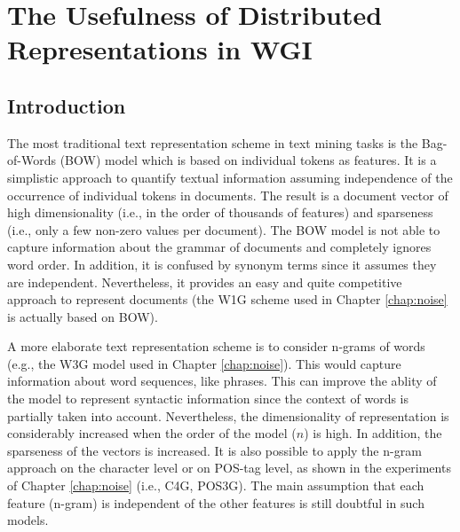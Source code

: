 
\chapter{The Usefulness of Distributed Representations in WGI}

\label{chap:word_embeddings}



\newcommand{\keyword}[1]{\textbf{#1}}
\newcommand{\tabhead}[1]{\textbf{#1}}
\newcommand{\code}[1]{\texttt{#1}}
\newcommand{\file}[1]{\texttt{\bfseries#1}}
\newcommand{\option}[1]{\texttt{\itshape#1}}


\section{Introduction}\label{chap:word_embeddings:sec:intro}
 
The most traditional text representation scheme in text mining tasks is the Bag-of-Words (BOW) model which is based on individual tokens as features. It is a simplistic approach to quantify textual information assuming independence of the occurrence of individual tokens in documents. The result is a document vector of high dimensionality (i.e., in the order of thousands of features) and sparseness (i.e., only a few non-zero values per document). The BOW model is not able to capture information about the grammar of documents and completely ignores word order. In addition, it is confused by synonym terms since it assumes they are independent. Nevertheless, it provides an easy and quite competitive approach to represent documents (the W1G scheme used in Chapter \ref{chap:noise} is actually based on BOW).

A more elaborate text representation scheme is to consider n-grams of words (e.g., the W3G model used in Chapter \ref{chap:noise}). This would capture information about word sequences, like phrases. This can improve the ablity of the model to represent syntactic information since the context of words is partially taken into account. Nevertheless, the dimensionality of representation is considerably increased when the order of the model ($n$) is high. In addition, the sparseness of the vectors is increased. It is also possible to apply the n-gram approach on the character level or on POS-tag level, as shown in the experiments of Chapter \ref{chap:noise} (i.e., C4G, POS3G). The main assumption that each feature (n-gram) is independent of the other features is still doubtful in such models.

